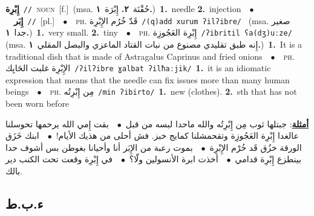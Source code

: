 \documentclass[10pt,a4paper,twoside]{article} %
\begin{document}
\begin{multicols}{2}
{\setlength\topsep{0pt}\textbf{\foreignlanguage{arabic}{إِبْرِة}}\ {\color{gray}\texttt{//}\color{black}}\ \textsc{noun}\ [f.]\ \color{gray}(msa. \foreignlanguage{arabic}{حُقْنَة}~\foreignlanguage{arabic}{\textbf{٢.}}  \foreignlanguage{arabic}{إِبْرَة}~\foreignlanguage{arabic}{\textbf{١.}})\color{black}\ \textbf{1.}~needle  \textbf{2.}~injection\ \ $\bullet$\ \ \setlength\topsep{0pt}\textbf{\foreignlanguage{arabic}{إِبَر}}\ {\color{gray}\texttt{//}\color{black}}\ [pl.]\ \ $\bullet$\ \ \textsc{ph.} \color{gray} \foreignlanguage{arabic}{قَدّ خُرُم الإِبْرِة}\color{black}\ {\color{gray}\texttt{/{\sffamily (q)add xurum ʔilʔibre}/}\color{black}}\ \color{gray} (msa. \foreignlanguage{arabic}{صغير جدا}~\foreignlanguage{arabic}{\textbf{١.}})\color{black}\ \textbf{1.}~very small.  \textbf{2.}~tiny\ \ $\bullet$\ \ \textsc{ph.} \color{gray} \foreignlanguage{arabic}{إِبْرِة العَجُوزِة}\color{black}\ {\color{gray}\texttt{/{\sffamily ʔibritil ʕa(dʒ)uːze}/}\color{black}}\ \color{gray} (msa. \foreignlanguage{arabic}{إِنه طبق تقليدي مصنوع من نبات القتاد الماعزي والبصل المقلي}~\foreignlanguage{arabic}{\textbf{١.}})\color{black}\ \textbf{1.}~It is a traditional dish that is made of Astragalus Caprinus and fried onions\ \ $\bullet$\ \ \textsc{ph.} \color{gray} \foreignlanguage{arabic}{الإِبْرِة غلبت الحَايِك}\color{black}\ {\color{gray}\texttt{/{\sffamily ʔilʔibre ɣalbat ʔilħaːjik}/}\color{black}}\ \textbf{1.}~it is an idiomatic expression that means that the needle can fix issues more than many human beings\ \ $\bullet$\ \ \textsc{ph.} \color{gray} \foreignlanguage{arabic}{مِن إِبْرِتُه}\color{black}\ {\color{gray}\texttt{/{\sffamily min ʔibirto}/}\color{black}}\ \textbf{1.}~new (clothes).  \textbf{2.}~sth that has not been worn before\  \begin{flushright}\color{gray}\foreignlanguage{arabic}{\textbf{\underline{\foreignlanguage{arabic}{أمثلة}}}: جبتلها ثوب مِن إِبْرِتُه والله ماحدا لبسه من قبل\ $\bullet$\ \  بقت إِمي الله يرحمها تحوسلنا عالغدا إِبْرِة العَجُوزِة وتقحمشلنا كمايج خبز. فش أحلى من هذيك الأيام!\ $\bullet$\ \  ابنك خَزَق الورقة خزُق قَد خُرْم الإِبْرِة\ $\bullet$\ \  بموت رعبة من الإِبَر أنا وأحيانا بغوطن بس أشوف حدا بينطزع إِبْرِة قدامي\ $\bullet$\ \  أخذت ابرة الأنسولين ولّا؟\ $\bullet$\ \  في إِبْرِة وقعت تحت الكنب دير بالك.}\end{flushright}\color{black}} \vspace{2mm}

\vspace{-3mm}
\subsection*{\color{blue}\foreignlanguage{arabic}{ء.ب.ط}\color{blue}{}} 


\end{multicols}
\end{document}
